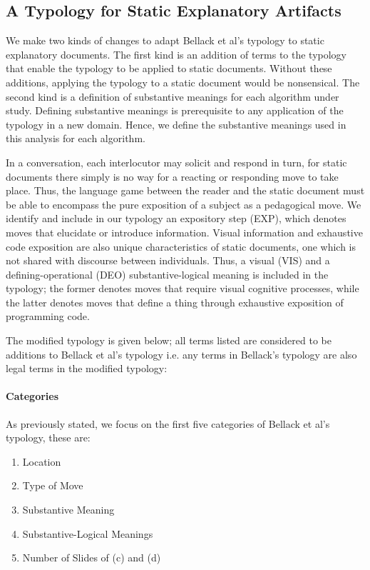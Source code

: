 \documentclass[conference]{IEEEtran}
\begin{document}
\subsection{A Typology for Static Explanatory Artifacts}
\label{sec:exp:typ}

We make two kinds of changes to adapt Bellack et al's typology to static
explanatory documents. The first kind is an addition of terms to the typology
that enable the typology to be applied to static documents. Without these additions,
applying the typology to a static document would be nonsensical. The second kind
is a definition of substantive meanings for each algorithm under study.
Defining substantive meanings is prerequisite to any application of the typology
in a new domain. Hence, we define the substantive meanings used in this analysis
for each algorithm.

In a conversation, each interlocutor may solicit and respond in turn, for static
documents there simply is no way for a reacting or responding move to take
place. Thus, the language game between the reader and the static document must
be able to encompass the pure exposition of a subject as a pedagogical move. We
identify and include in our typology an expository step (EXP), which denotes
moves that elucidate or introduce information. Visual information and exhaustive
code exposition are also unique characteristics of static documents, one which
is not shared with discourse between individuals. Thus, a visual (VIS) and a
defining-operational (DEO) substantive-logical meaning is included in the
typology; the former denotes moves that require visual cognitive processes,
while the latter denotes moves that define a thing through exhaustive exposition
of programming code.

The modified typology is given below; all terms listed are considered to be additions to
Bellack et al's typology i.e. any terms in Bellack's typology are also
legal terms in the modified typology:

\paragraph{Categories}
As previously stated, we focus on the first five categories of Bellack et al's
typology, these are:
\begin{enumerate}
  \item Location
  \item Type of Move
  \item Substantive Meaning
  \item Substantive-Logical Meanings
  \item Number of Slides of (c) and (d)
\end{enumerate}
\end{document}
